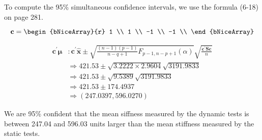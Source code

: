 To compute the 95\% simultaneous confidence intervals, we use the formula (6-18) on page 281.

\[
    \textbf{c}
    =
    \begin{bNiceArray}{r}
         1 \\
         1 \\
        -1 \\
        -1 \\
    \end{bNiceArray}
\]

\begin{align*}
    \textbf{c}^{\prime}\bm{\mu}
    & :
    \textbf{c}^{\prime}\hat{\textbf{x}}
    \pm
    \sqrt{\frac{(n-1)(p-1)}{n-q+1} F_{p-1, n-p+1} (\alpha)}
    \sqrt{\frac{\textbf{c}^{\prime}\textbf{S}\textbf{c}}{n}}
    \\
    & \Rightarrow
    421.53 \pm \sqrt{3.2222 \times 2.9604}\sqrt{3191.9833}
    \\
    & \Rightarrow
    421.53 \pm \sqrt{9.5389}\sqrt{3191.9833}
    \\
    & \Rightarrow
    421.53 \pm 174.4937 
    \\
    & \Rightarrow
    (247.0397, 596.0270) 
\end{align*}

We are 95\% confident that the mean siffness measured by the dynamic tests is between 247.04 and 596.03 units larger than the mean stiffness measured by the static tests.